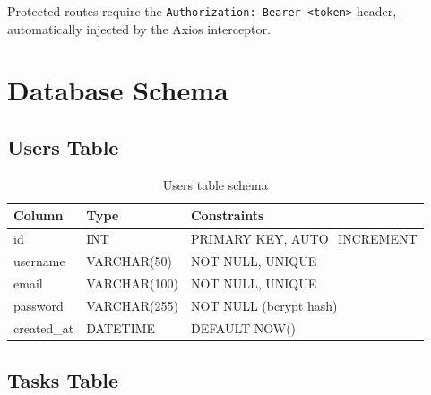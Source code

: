\documentclass[12pt, a4paper]{article}
\begin{document}
Protected routes require the \texttt{Authorization: Bearer <token>} header, automatically injected by the Axios interceptor.

\section{Database Schema}

\subsection{Users Table}

\begin{table}[H]
\centering
\begin{tabularx}{0.9\textwidth}{llX}
\toprule
\textbf{Column} & \textbf{Type} & \textbf{Constraints} \\
\midrule
id         & INT          & PRIMARY KEY, AUTO\_INCREMENT \\
username   & VARCHAR(50)  & NOT NULL, UNIQUE \\
email      & VARCHAR(100) & NOT NULL, UNIQUE \\
password   & VARCHAR(255) & NOT NULL (bcrypt hash) \\
created\_at & DATETIME     & DEFAULT NOW() \\
\bottomrule
\end{tabularx}
\caption{Users table schema}
\end{table}

\subsection{Tasks Table}
\end{document}
